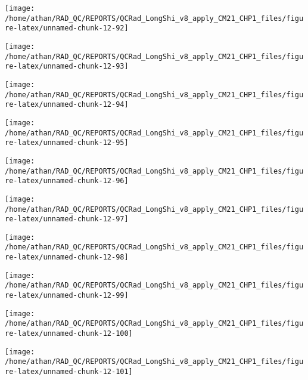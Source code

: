\documentclass[
  10pt,
  a4paper,oneside]{article}
\begin{document}
\begin{center}\texttt{[image: /home/athan/RAD\_QC/REPORTS/QCRad\_LongShi\_v8\_apply\_CM21\_CHP1\_files/figure-latex/unnamed-chunk-12-92]} \end{center}

\begin{center}\texttt{[image: /home/athan/RAD\_QC/REPORTS/QCRad\_LongShi\_v8\_apply\_CM21\_CHP1\_files/figure-latex/unnamed-chunk-12-93]} \end{center}

\begin{center}\texttt{[image: /home/athan/RAD\_QC/REPORTS/QCRad\_LongShi\_v8\_apply\_CM21\_CHP1\_files/figure-latex/unnamed-chunk-12-94]} \end{center}

\begin{center}\texttt{[image: /home/athan/RAD\_QC/REPORTS/QCRad\_LongShi\_v8\_apply\_CM21\_CHP1\_files/figure-latex/unnamed-chunk-12-95]} \end{center}

\begin{center}\texttt{[image: /home/athan/RAD\_QC/REPORTS/QCRad\_LongShi\_v8\_apply\_CM21\_CHP1\_files/figure-latex/unnamed-chunk-12-96]} \end{center}

\begin{center}\texttt{[image: /home/athan/RAD\_QC/REPORTS/QCRad\_LongShi\_v8\_apply\_CM21\_CHP1\_files/figure-latex/unnamed-chunk-12-97]} \end{center}

\begin{center}\texttt{[image: /home/athan/RAD\_QC/REPORTS/QCRad\_LongShi\_v8\_apply\_CM21\_CHP1\_files/figure-latex/unnamed-chunk-12-98]} \end{center}

\begin{center}\texttt{[image: /home/athan/RAD\_QC/REPORTS/QCRad\_LongShi\_v8\_apply\_CM21\_CHP1\_files/figure-latex/unnamed-chunk-12-99]} \end{center}

\begin{center}\texttt{[image: /home/athan/RAD\_QC/REPORTS/QCRad\_LongShi\_v8\_apply\_CM21\_CHP1\_files/figure-latex/unnamed-chunk-12-100]} \end{center}

\begin{center}\texttt{[image: /home/athan/RAD\_QC/REPORTS/QCRad\_LongShi\_v8\_apply\_CM21\_CHP1\_files/figure-latex/unnamed-chunk-12-101]} \end{center}
\end{document}
